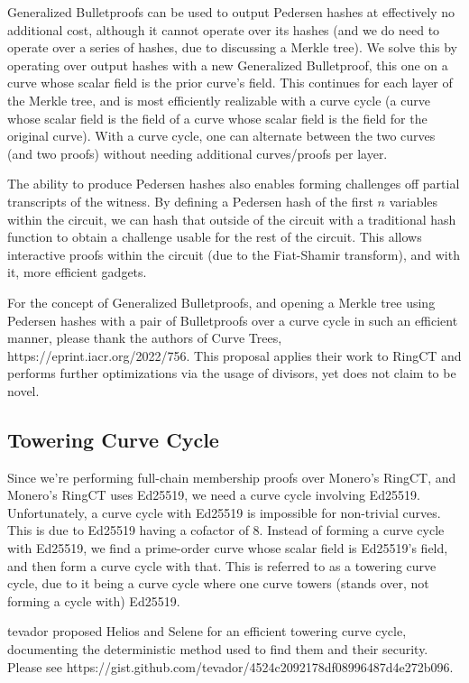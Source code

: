 \documentclass[]{article}
\begin{document}
Generalized Bulletproofs can be used to output Pedersen hashes at effectively no additional cost, although it cannot operate over its hashes (and we do need to operate over a series of hashes, due to discussing a Merkle tree). We solve this by operating over output hashes with a new Generalized Bulletproof, this one on a curve whose scalar field is the prior curve's field. This continues for each layer of the Merkle tree, and is most efficiently realizable with a curve cycle (a curve whose scalar field is the field of a curve whose scalar field is the field for the original curve). With a curve cycle, one can alternate between the two curves (and two proofs) without needing additional curves/proofs per layer.

The ability to produce Pedersen hashes also enables forming challenges off partial transcripts of the witness. By defining a Pedersen hash of the first $n$ variables within the circuit, we can hash that outside of the circuit with a traditional hash function to obtain a challenge usable for the rest of the circuit. This allows interactive proofs within the circuit (due to the Fiat-Shamir transform), and with it, more efficient gadgets.

For the concept of Generalized Bulletproofs, and opening a Merkle tree using Pedersen hashes with a pair of Bulletproofs over a curve cycle in such an efficient manner, please thank the authors of Curve Trees, https://eprint.iacr.org/2022/756. This proposal applies their work to RingCT and performs further optimizations via the usage of divisors, yet does not claim to be novel.

\subsection{Towering Curve Cycle}

Since we're performing full-chain membership proofs over Monero's RingCT, and Monero's RingCT uses Ed25519, we need a curve cycle involving Ed25519. Unfortunately, a curve cycle with Ed25519 is impossible for non-trivial curves. This is due to Ed25519 having a cofactor of 8. Instead of forming a curve cycle with Ed25519, we find a prime-order curve whose scalar field is Ed25519's field, and then form a curve cycle with that. This is referred to as a towering curve cycle, due to it being a curve cycle where one curve towers (stands over, not forming a cycle with) Ed25519.

tevador proposed Helios and Selene for an efficient towering curve cycle, documenting the deterministic method used to find them and their security. Please see https://gist.github.com/tevador/4524c2092178df08996487d4e272b096.
\end{document}
